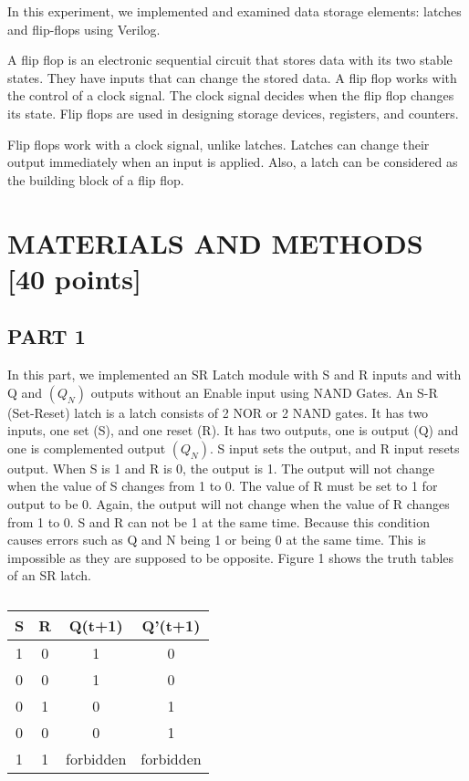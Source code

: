 \documentclass[pdftex,12pt,a4paper]{article}
\begin{document}
In this experiment, we implemented and examined data storage elements: latches and flip-flops using Verilog. 

A flip flop is an electronic sequential circuit that stores data with its two stable states. They have inputs that can change the stored data. A flip flop works with the control of a clock signal. The clock signal decides when the flip flop changes its state. Flip flops are used in designing storage devices, registers, and counters.

Flip flops work with a clock signal, unlike latches. Latches can change their output immediately when an input is applied. Also, a latch can be considered as the building block of a flip flop.



\section{MATERIALS AND METHODS [40 points]}



\subsection{PART 1}

In this part, we implemented an SR Latch module with S and R inputs and with Q and \((Q_N)\) outputs without an Enable input using NAND Gates. An S-R (Set-Reset) latch is a latch consists of 2 NOR or 2 NAND gates. It has two inputs, one set (S), and one reset (R).  It has two outputs, one is output (Q) and one is complemented output \((Q_N)\). S input sets the output, and R input resets output. When S is 1 and R is 0, the output is 1. The output will not change when the value of S changes from 1 to 0. The value of R must be set to 1 for output to be 0. Again, the output will not change when the value of R changes from 1 to 0. S and R can not be 1 at the same time. Because this condition causes errors such as Q and N being 1  or being 0 at the same time. This is impossible as they are supposed to be opposite. Figure 1 shows the truth tables of an SR latch. 


\begin{table}[h!]
\begin{tabular}{|c|c|c|c|}
\hline
S & R & Q(t+1)    & Q'(t+1)   \\ \hline
1 & 0 & 1         & 0         \\ \hline
0 & 0 & 1         & 0         \\ \hline
0 & 1 & 0         & 1         \\ \hline
0 & 0 & 0         & 1         \\ \hline
1 & 1 & forbidden & forbidden \\ \hline

\end{tabular}
\caption{\label{tab:table-name}}
\end{table}
\end{document}
